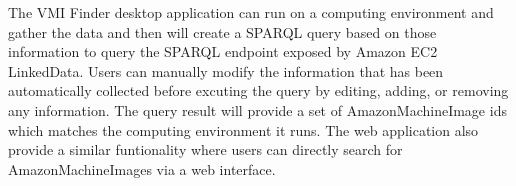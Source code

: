 The VMI Finder desktop application can run on a computing environment and gather the data and then will create a SPARQL query based on those information to query the SPARQL endpoint exposed by Amazon EC2 LinkedData. Users can manually modify the information that has been automatically collected before excuting the query by editing, adding, or removing any information. The query result will provide a set of AmazonMachineImage ids which matches the computing environment it runs. The web application also provide a similar funtionality where users can directly search for AmazonMachineImages via a web interface. 


